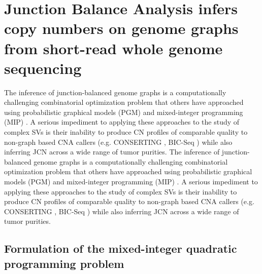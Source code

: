 \documentclass[phd,tocprelim]{cornell}
\begin{document}

\section{Junction Balance Analysis infers copy numbers on genome graphs from short-read whole genome sequencing}
The inference of junction-balanced genome graphs is a computationally challenging combinatorial optimization problem that others have approached using probabilistic graphical models (PGM) and mixed-integer programming (MIP) \cite{Medvedev:2010bm, Greenman:2012eg, Oesper2012-vw, Li2016-qa, Dzamba2017-wo, McPherson2017-ry}. A serious impediment to applying these approaches to the study of complex SVs is their inability to produce CN profiles of comparable quality to non-graph based CNA callers (e.g. CONSERTING \cite{Chen2015-sw}, BIC-Seq \cite{Xi2011-oa}) while also inferring JCN across a wide range of tumor purities. 
The inference of junction-balanced genome graphs is a computationally challenging combinatorial optimization problem that others have approached using probabilistic graphical models (PGM) and mixed-integer programming (MIP) \cite{Medvedev:2010bm, Greenman:2012eg, Oesper2012-vw, Li2016-qa, Dzamba2017-wo, McPherson2017-ry}. A serious impediment to applying these approaches to the study of complex SVs is their inability to produce CN profiles of comparable quality to non-graph based CNA callers (e.g. CONSERTING \cite{Chen2015-sw}, BIC-Seq \cite{Xi2011-oa}) while also inferring JCN across a wide range of tumor purities. 

\subsection{Formulation of the mixed-integer quadratic programming problem}
\end{document}
